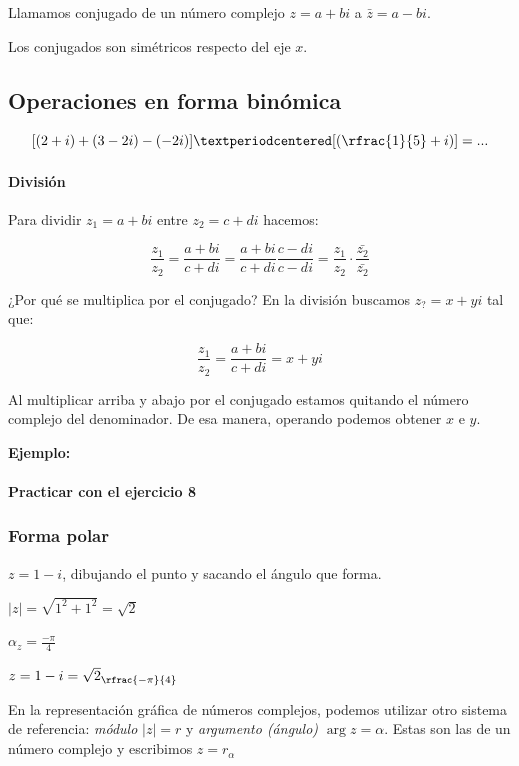 \begin{defn} Llamamos conjugado de un número complejo $z = a+bi$ a $\bar{z} = a-bi$.

\obs Los conjugados son simétricos respecto del eje $x$.
\end{defn}

\subsection{Operaciones en forma binómica} 

\[
[(2+i)+(3-2i) - (-2i)]·[(\rfrac{1}{5}+i)] = ...
\]

\paragraph{División}

Para dividir $z_1 = a+bi$ entre $z_2 = c+di$ hacemos:

\[
\frac{z_1}{z_2} = \frac{a+bi}{c+di} = \frac{a+bi}{c+di} \frac{c-di}{c-di} = \frac{z_1}{z_2}·\frac{\bar{z_2}}{\bar{z_2}}
\]

¿Por qué se multiplica por el conjugado? En la división buscamos $z_? = x+yi$ tal que:

\[\frac{z_1}{z_2} = \frac{a+bi}{c+di} = x+yi\]

Al multiplicar arriba y abajo por el conjugado estamos quitando el número complejo del denominador. De esa manera, operando podemos obtener $x$ e $y$.


\textbf{Ejemplo: }


\paragraph{Practicar con el ejercicio 8} 

\subsubsection{Forma polar}


\begin{example}
 $z = 1-i$, dibujando el punto y sacando el ángulo que forma. 

$|z| = \sqrt{1^2+1^2} = \sqrt{2}$

$\alpha_z = \frac{-\pi}{4}$

$z = 1-i = \sqrt{2}_{\rfrac{-\pi}{4}}$

\end{example}

En la representación gráfica de números complejos, podemos utilizar otro sistema de referencia: \textit{módulo} $|z|=r$ y \textit{argumento (ángulo)} $\arg{z} = α$. 
%
Estas son las  de un número complejo y escribimos $z = r_α$


